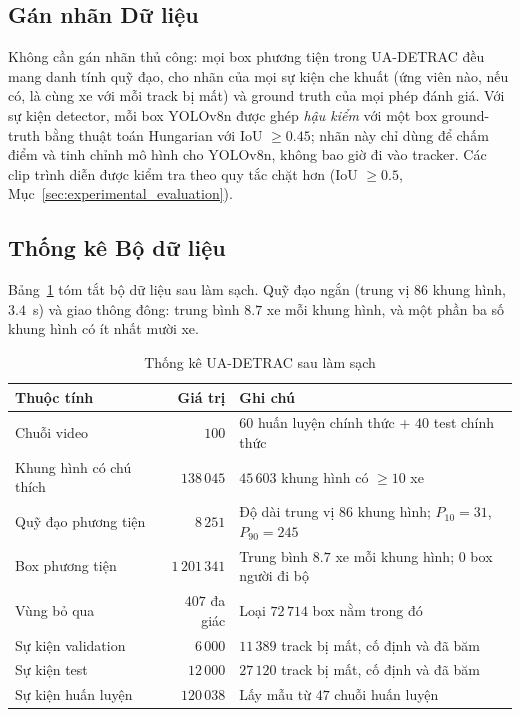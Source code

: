 \subsection{Gán nhãn Dữ liệu}
\label{sec:data_annotation}

Không cần gán nhãn thủ công: mọi box phương tiện trong UA-DETRAC đều mang danh tính quỹ đạo, cho nhãn của mọi sự kiện che khuất (ứng viên nào, nếu có, là cùng xe với mỗi track bị mất) và ground truth của mọi phép đánh giá. Với sự kiện detector, mỗi box YOLOv8n được ghép \emph{hậu kiểm} với một box ground-truth bằng thuật toán Hungarian với IoU $\ge 0.45$; nhãn này chỉ dùng để chấm điểm và tinh chỉnh mô hình cho YOLOv8n, không bao giờ đi vào tracker. Các clip trình diễn được kiểm tra theo quy tắc chặt hơn (IoU $\ge 0.5$, Mục~\ref{sec:experimental_evaluation}).

\subsection{Thống kê Bộ dữ liệu}
\label{sec:dataset_stats}

Bảng~\ref{tab:dataset_stats} tóm tắt bộ dữ liệu sau làm sạch. Quỹ đạo ngắn (trung vị $86$ khung hình, $3.4$~s) và giao thông đông: trung bình $8.7$ xe mỗi khung hình, và một phần ba số khung hình có ít nhất mười xe.

\begin{table}[H]
    \centering
    \caption{Thống kê UA-DETRAC sau làm sạch}
    \label{tab:dataset_stats}
    \begin{tabularx}{\textwidth}{l r X}
        \toprule
        \textbf{Thuộc tính} & \textbf{Giá trị} & \textbf{Ghi chú} \\
        \midrule
        Chuỗi video & $100$ & $60$ huấn luyện chính thức + $40$ test chính thức \\
        Khung hình có chú thích & $138\,045$ & $45\,603$ khung hình có $\ge 10$ xe \\
        Quỹ đạo phương tiện & $8\,251$ & Độ dài trung vị $86$ khung hình; $P_{10}=31$, $P_{90}=245$ \\
        Box phương tiện & $1\,201\,341$ & Trung bình $8.7$ xe mỗi khung hình; $0$ box người đi bộ \\
        Vùng bỏ qua & $407$ đa giác & Loại $72\,714$ box nằm trong đó \\
        Sự kiện validation & $6\,000$ & $11\,389$ track bị mất, cố định và đã băm \\
        Sự kiện test & $12\,000$ & $27\,120$ track bị mất, cố định và đã băm \\
        Sự kiện huấn luyện & $120\,038$ & Lấy mẫu từ $47$ chuỗi huấn luyện \\
        \bottomrule
    \end{tabularx}
\end{table}

